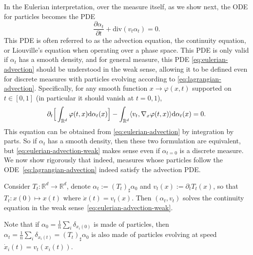 In the Eulerian interpretation, over the measure itself, as we show next, the ODE for particles becomes the PDE
\begin{equation}
    \frac{\partial \alpha_t}{\partial t} + \mathrm{div}(v_t \alpha_t) = 0. \label{eq:eulerian-advection}
\end{equation}
This PDE is often referred to as the advection equation, the continuity equation, or Liouville's equation when operating over a phase space.
%
This PDE is only valid if $\alpha_t$ has a smooth density, and for general measure, this PDE \eqref{eq:eulerian-advection} should be understood in the weak sense, allowing it to be defined even for discrete measures with particles evolving according to \eqref{eq:lagrangian-advection}. Specifically, for any smooth function $x \to \varphi(x,t)$ supported on $t \in [0,1]$ (in particular it should vanish at $t=0,1$), 
\begin{equation}\label{eq:eulerian-advection-weak}
    \partial_t \Big[ \int_{\mathbb{R}^d} \varphi(t,x) \mathrm{d} \alpha_t(x) \Big]
    - \int_{\mathbb{R}^d} \langle v_t, \nabla_x \varphi(t,x) \rangle \mathrm{d} \alpha_t(x) = 0.
\end{equation}
This equation can be obtained from \eqref{eq:eulerian-advection} by integration by parts. So if $\alpha_t$ has a smooth density, then these two formulation are equivalent, but \eqref{eq:eulerian-advection-weak} makes sense even if $\alpha_{t=0}$ is a discrete measure.
%
We now show rigorously that indeed, measures whose particles follow the ODE~\eqref{eq:lagrangian-advection} indeed satisfy the advection PDE.

\begin{prop}
Consider $T_t : \mathbb{R}^d \to \mathbb{R}^d$, denote $\alpha_t := (T_t)_\sharp \alpha_0$ and $v_t(x) := \partial_t T_t(x)$, so that $T_t : x(0) \mapsto x(t)$ where $\dot{x}(t) = v_t(x)$. Then $(\alpha_t, v_t)$ solves the continuity equation in the weak sense~\eqref{eq:eulerian-advection-weak}.
\end{prop}

Note that if $\alpha_0 = \frac{1}{n} \sum_i \delta_{x_i(0)}$ is made of particles, then $\alpha_t = \frac{1}{n} \sum_i \delta_{x_i(t)} = (T_t)_\sharp \alpha_0$ is also made of particles evolving at speed $\dot x_i(t) = v_t(x_i(t))$.

